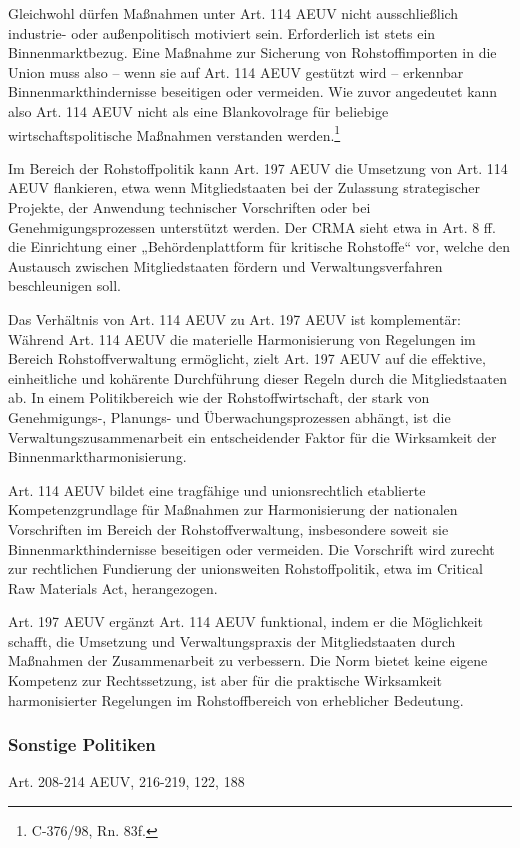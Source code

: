 \documentclass[12pt,a4paper,oneside]{book} %
\begin{document}
Gleichwohl dürfen Maßnahmen unter Art. 114 AEUV nicht ausschließlich industrie- oder außenpolitisch motiviert sein. Erforderlich ist stets ein Binnenmarktbezug. Eine Maßnahme zur Sicherung von Rohstoffimporten in die Union muss also – wenn sie auf Art. 114 AEUV gestützt wird – erkennbar Binnenmarkthindernisse beseitigen oder vermeiden. Wie zuvor angedeutet kann also Art. 114 AEUV nicht als eine Blankovolrage für beliebige wirtschaftspolitische Maßnahmen verstanden werden.\footnote{C-376/98, Rn. 83f.}

Im Bereich der Rohstoffpolitik kann Art. 197 AEUV die Umsetzung von Art. 114 AEUV flankieren, etwa wenn Mitgliedstaaten bei der Zulassung strategischer Projekte, der Anwendung technischer Vorschriften oder bei Genehmigungsprozessen unterstützt werden. Der CRMA sieht etwa in Art. 8 ff. die Einrichtung einer „Behördenplattform für kritische Rohstoffe“ vor, welche den Austausch zwischen Mitgliedstaaten fördern und Verwaltungsverfahren beschleunigen soll.

Das Verhältnis von Art. 114 AEUV zu Art. 197 AEUV ist komplementär: Während Art. 114 AEUV die materielle Harmonisierung von Regelungen im Bereich Rohstoffverwaltung ermöglicht, zielt Art. 197 AEUV auf die effektive, einheitliche und kohärente Durchführung dieser Regeln durch die Mitgliedstaaten ab. In einem Politikbereich wie der Rohstoffwirtschaft, der stark von Genehmigungs-, Planungs- und Überwachungsprozessen abhängt, ist die Verwaltungszusammenarbeit ein entscheidender Faktor für die Wirksamkeit der Binnenmarktharmonisierung.

Art. 114 AEUV bildet eine tragfähige und unionsrechtlich etablierte Kompetenzgrundlage für Maßnahmen zur Harmonisierung der nationalen Vorschriften im Bereich der Rohstoffverwaltung, insbesondere soweit sie Binnenmarkthindernisse beseitigen oder vermeiden. Die Vorschrift wird zurecht zur rechtlichen Fundierung der unionsweiten Rohstoffpolitik, etwa im Critical Raw Materials Act, herangezogen.

Art. 197 AEUV ergänzt Art. 114 AEUV funktional, indem er die Möglichkeit schafft, die Umsetzung und Verwaltungspraxis der Mitgliedstaaten durch Maßnahmen der Zusammenarbeit zu verbessern. Die Norm bietet keine eigene Kompetenz zur Rechtssetzung, ist aber für die praktische Wirksamkeit harmonisierter Regelungen im Rohstoffbereich von erheblicher Bedeutung.
	
	
\subsubsection{Sonstige Politiken}
Art. 208-214 AEUV, 216-219, 122, 188
	
\end{document}
